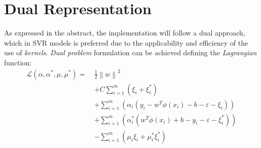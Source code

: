 \documentclass[12pt]{article}
\newcommand{\norm}[1]{\left\lVert#1\right\rVert}
\newcommand{\Lagr}{\mathcal{L}}
\begin{document}
	\section{Dual Representation}
	As expressed in the abstract, the implementation will follow a dual approach, which in SVR models is preferred due to the applicability and efficiency of the use of \textit{kernels}. \textit{Dual problem} formulation can be achieved defining the \textit{Lagrangian} function:
	\begin{equation}\label{eq:4}
    	\begin{aligned}
    		\Lagr(\alpha,\alpha^*,\mu,\mu^*) =  \ &\frac{1}{2}\norm{w}^2\\
    		&+C\sum_{i=1}^{m}(\xi_{i} + \xi_{i}^*) \\
    		&+ \sum_{i=1}^{m}(\alpha_i(y_i - w^T\phi(x_i) - b - \varepsilon - \xi_i))\\
    		&+ \sum_{i=1}^{m}(\alpha_i^*(w^T\phi(x_i) + b - y_i - \varepsilon - \xi_i^*)) \\
    		&- \sum_{i=1}^{m}(\mu_i\xi_i + \mu_i^*\xi_i^*)
    	\end{aligned}
	\end{equation}
	
\end{document}

